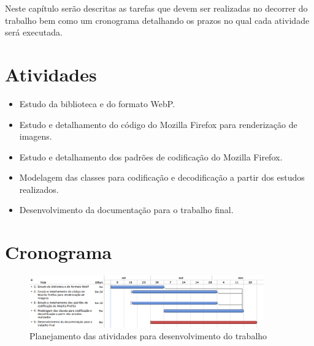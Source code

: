 \documentclass[espaco=simples,appendix=Name]{abnt}
\begin{document}
\begin{description}
\item \noindent
Neste capítulo serão descritas as tarefas que devem ser realizadas no decorrer do trabalho bem como um cronograma detalhando os prazos no qual cada atividade será executada.

\section{Atividades}
\begin{itemize}
        \item Estudo da biblioteca e do formato WebP.
        \item Estudo e detalhamento do código do Mozilla Firefox para renderização de imagens.
        \item Estudo e detalhamento dos padrões de codificação do Mozilla Firefox.
        \item Modelagem das classes para codificação e decodificação a partir dos estudos realizados.
        \item Desenvolvimento da documentação para o trabalho final.

\end{itemize}
\section{Cronograma}
\begin{figure}[H]
  \centering
    \includegraphics[width=0.9\textwidth]{scheduler.png}
  \caption{Planejamento das atividades para desenvolvimento do trabalho}
\end{figure}
\end{description}


\end{document}
